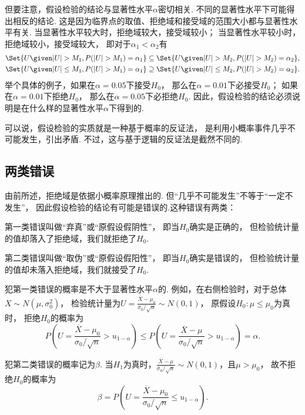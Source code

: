 但要注意，假设检验的结论与显著性水平\(\alpha\)密切相关.
不同的显著性水平下可能得出相反的结论.
这是因为临界点的取值、拒绝域和接受域的范围大小都与显著性水平有关.
当显著性水平较大时，拒绝域较大，接受域较小；
当显著性水平较小时，拒绝域较小，接受域较大，
即对于\(\alpha_1 < \alpha_2\)有\begin{gather*}
	\Set{ U \given \abs{U} > M_1, P(\abs{U} > M_1) = \alpha_1 }
	\subseteq
	\Set{ U \given \abs{U} > M_2, P(\abs{U} > M_2) = \alpha_2 }, \\
	\Set{ U \given \abs{U} \leq M_1, P(\abs{U} > M_1) = \alpha_1 }
	\supseteq
	\Set{ U \given \abs{U} \leq M_2, P(\abs{U} > M_2) = \alpha_2 }.
\end{gather*}
举个具体的例子，如果在\(\alpha=0.05\)下接受\(H_0\)，
那么在\(\alpha=0.01\)下必接受\(H_0\)；
如果在\(\alpha=0.01\)下拒绝\(H_0\)，
那么在\(\alpha=0.05\)下必拒绝\(H_0\).
因此，假设检验的结论必须说明是在什么样的显著性水平\(\alpha\)下得到的.

可以说，假设检验的实质就是一种基于概率的反证法，
是利用小概率事件几乎不可能发生，引出矛盾.
不过，这与基于逻辑的反证法是截然不同的.

\subsection{两类错误}
由前所述，拒绝域是依据小概率原理推出的.
但“几乎不可能发生”不等于“一定不发生”，
因此假设检验的结论有可能是错误的.这种错误有两类：

第一类错误叫做“弃真”或“原假设假阴性”，
即当\(H_0\)确实是正确的，
但检验统计量的值却落入了拒绝域，我们就拒绝了\(H_0\).

第二类错误叫做“取伪”或“原假设假阳性”，
即当\(H_0\)确实是错误的，
但检验统计量的值却未落入拒绝域，我们就接受了\(H_0\).

犯第一类错误的概率是不大于显著性水平\(\alpha\)的.
例如，在右侧检验时，对于总体\(X \sim N(\mu,\sigma_0^2)\)，
检验统计量为\(U = \frac{\overline{X}-\mu_0}{\sigma_0 / \sqrt{n}} \sim N(0,1)\)，
原假设\(H_0: \mu\leq\mu_0\)为真时，
拒绝\(H_0\)的概率为\[
	P\left(U=\frac{\overline{X}-\mu_0}{\sigma_0 / \sqrt{n}}>u_{1-\alpha}\right)
	\leq P\left(U=\frac{\overline{X}-\mu}{\sigma_0 / \sqrt{n}}>u_{1-\alpha}\right)
	= \alpha.
\]

犯第二类错误的概率记为\(\beta\).
当\(H_1\)为真时，\(\frac{\overline{X}-\mu}{\sigma_0/\sqrt{n}} \sim N(0,1)\)，且\(\mu>\mu_0\)，
故不拒绝\(H_0\)的概率为\[
	\beta=P\left(U=\frac{\overline{X}-\mu_0}{\sigma_0/\sqrt{n}} \leq u_{1-\alpha}\right).
\]

